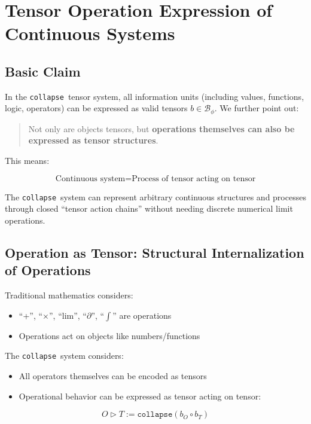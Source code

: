 \documentclass[12pt,a4paper]{article}
\theoremstyle{plain}
\theoremstyle{definition}
\theoremstyle{remark}
\newcommand{\collapse}{\texttt{collapse}}
\newcommand{\Bphi}{\mathcal{B}_\phi}
\begin{document}
\appendix

\section{Tensor Operation Expression of Continuous Systems}

\subsection{Basic Claim}

In the \collapse\ tensor system, all information units (including values, functions, logic, operators) can be expressed as valid tensors $b \in \Bphi$. We further point out:

\begin{quote}
Not only are objects tensors, but \textbf{operations themselves can also be expressed as tensor structures}.
\end{quote}

This means:

\begin{equation}
\text{Continuous system} = \text{Process of tensor acting on tensor}
\end{equation}

The \collapse\ system can represent arbitrary continuous structures and processes through closed ``tensor action chains'' without needing discrete numerical limit operations.

\subsection{Operation as Tensor: Structural Internalization of Operations}

Traditional mathematics considers:
\begin{itemize}
\item ``+'', ``$\times$'', ``lim'', ``$\partial$'', ``$\int$'' are operations
\item Operations act on objects like numbers/functions
\end{itemize}

The \collapse\ system considers:
\begin{itemize}
\item All operators themselves can be encoded as tensors
\item Operational behavior can be expressed as tensor acting on tensor:
\end{itemize}

\begin{equation}
O \triangleright T := \collapse(b_O \circ b_T)
\end{equation}
\end{document}
